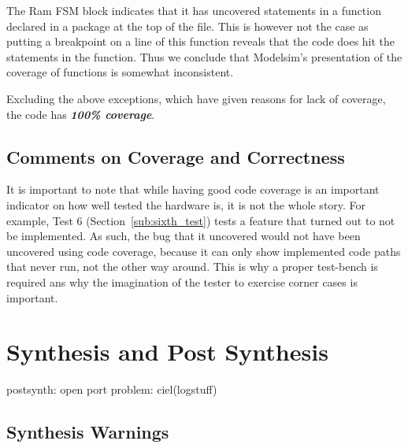 \documentclass[]{article}
\begin{document}
The Ram FSM block indicates that it has uncovered statements in a function declared in a package at the top of the file. This is however not the case as putting a breakpoint on a line of this function reveals that the code does hit the statements in the function. Thus we conclude that Modelsim's presentation of the coverage of functions is somewhat inconsistent.

Excluding the above exceptions, which have given reasons for lack of coverage, the code has \emph{\textbf{100\% coverage}}.

\subsection{Comments on Coverage and Correctness} %
\label{sub:comments_on_coverage_and_correctness}

It is important to note that while having good code coverage is an important indicator on how well tested the hardware is, it is not the whole story. For example, Test 6 (Section~\ref{sub:sixth_test}) tests a feature that turned out to not be implemented.
As such, the bug that it uncovered would not have been uncovered using code coverage, because it can only show implemented code paths that never run, not the other way around. This is why a proper test-bench is required ans why the imagination of the tester to exercise corner cases is important.



\section{Synthesis and Post Synthesis} %
\label{sec:synthesis_and_post_synthesis}

postsynth: open port problem: ciel(logstuff)

\subsection{Synthesis Warnings} %
\label{sub:synthesis_warnings}
\end{document}
